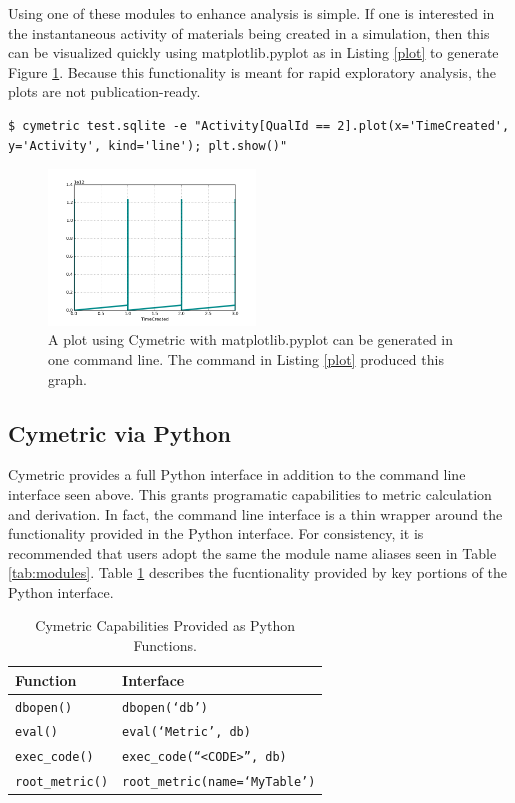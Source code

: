 \documentclass{anstrans}
\newcommand{\code}[1]{{\color{code}\texttt{#1}}}
\begin{document}
Using one of these modules to enhance analysis is simple. 
If one is interested in the instantaneous activity of materials being created in a simulation, 
then this can be visualized quickly using matplotlib.pyplot as in Listing \ref{plot} to generate Figure \ref{fig:actplot}.
Because this functionality is meant for rapid exploratory analysis, the plots are not publication-ready. 

\begin{lstlisting}[caption ={Creating a Plot}, label=plot]
$ cymetric test.sqlite -e "Activity[QualId == 2].plot(x='TimeCreated', y='Activity', kind='line'); plt.show()"
\end{lstlisting}

\begin{figure}[htbp!]
\begin{centering}
\includegraphics[width=0.49\textwidth]{act.png}
\end{centering}
\caption{A plot using Cymetric with matplotlib.pyplot can be generated in one command line. The command in Listing \ref{plot} produced this graph.}
\label{fig:actplot}
\end{figure}


\subsection{Cymetric via Python}
Cymetric provides a full Python interface in addition to the command line 
interface seen above. This grants programatic capabilities to metric 
calculation and derivation. In fact, the command line interface is a thin
wrapper around the functionality provided in the Python interface.
For consistency, it is recommended that users adopt the same the module name 
aliases seen in Table \ref{tab:modules}. 
Table \ref{tab:pyfunc} describes the fucntionality provided by key 
portions of the Python interface.

\begin{table}[htb]
\centering
\caption{Cymetric Capabilities Provided as Python Functions.}
\begin{tabular}{ll}
\toprule
  Function           & Interface                 \\
\midrule 
  \code{dbopen()}    & \code{dbopen(`db')}         \\
  \code{eval()}      & \code{eval(`Metric', db)}   \\
  \code{exec\_code()} & \code{exec\_code(``<CODE>'', db)}  \\ 
  \code{root\_metric()} & \code{root\_metric(name=`MyTable')}  \\
\bottomrule
\end{tabular}
\label{tab:pyfunc}
\end{table} 
\end{document}
